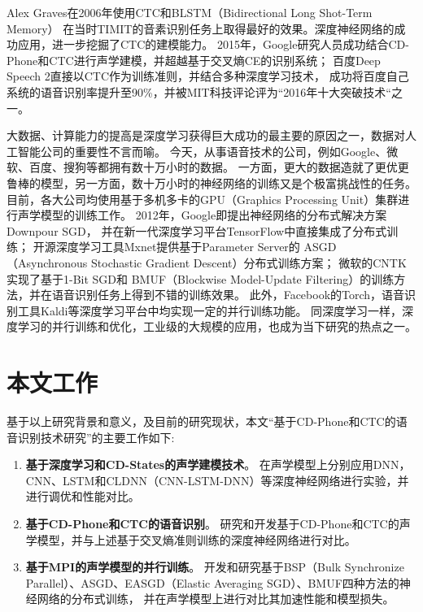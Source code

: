 Alex Graves在2006年使用CTC和BLSTM（Bidirectional Long Shot-Term Memory）
在当时TIMIT的音素识别任务上取得最好的效果。深度神经网络的成功应用，进一步挖掘了CTC的建模能力。
2015年，Google研究人员成功结合CD-Phone和CTC进行声学建模，并超越基于交叉熵CE的识别系统；
百度Deep Speech 2直接以CTC作为训练准则，并结合多种深度学习技术，
成功将百度自己系统的语音识别率提升至90\%，并被MIT科技评论评为“2016年十大突破技术“之一。

大数据、计算能力的提高是深度学习获得巨大成功的最主要的原因之一，数据对人工智能公司的重要性不言而喻。
今天，从事语音技术的公司，例如Google、微软、百度、搜狗等都拥有数十万小时的数据。
一方面，更大的数据造就了更优更鲁棒的模型，另一方面，数十万小时的神经网络的训练又是个极富挑战性的任务。
目前，各大公司均使用基于多机多卡的GPU（Graphics Processing Unit）集群进行声学模型的训练工作。
2012年，Google即提出神经网络的分布式解决方案Downpour SGD，
并在新一代深度学习平台TensorFlow中直接集成了分布式训练；
开源深度学习工具Mxnet提供基于Parameter Server的
ASGD（Asynchronous Stochastic Gradient Descent）分布式训练方案；
微软的CNTK实现了基于1-Bit SGD和
BMUF（Blockwise Model-Update Filtering）的训练方法，并在语音识别任务上得到不错的训练效果。
此外，Facebook的Torch，语音识别工具Kaldi等深度学习平台中均实现一定的并行训练功能。
同深度学习一样，深度学习的并行训练和优化，工业级的大规模的应用，也成为当下研究的热点之一。

\section{本文工作}

基于以上研究背景和意义，及目前的研究现状，本文“基于CD-Phone和CTC的语音识别技术研究”的主要工作如下:
\begin{enumerate}
\item \textbf{基于深度学习和CD-States的声学建模技术}。
    在声学模型上分别应用DNN，CNN、LSTM和CLDNN（CNN-LSTM-DNN）等深度神经网络进行实验，并进行调优和性能对比。
\item \textbf{基于CD-Phone和CTC的语音识别}。
    研究和开发基于CD-Phone和CTC的声学模型，并与上述基于交叉熵准则训练的深度神经网络进行对比。
\item \textbf{基于MPI的声学模型的并行训练}。
    开发和研究基于BSP（Bulk Synchronize Parallel）、ASGD、EASGD（Elastic Averaging SGD）、BMUF四种方法的神经网络的分布式训练，
并在声学模型上进行对比其加速性能和模型损失。
\end{enumerate}

